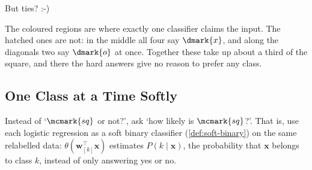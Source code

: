 \begin{question}
    But ties? :-)
\end{question}

The coloured regions are where exactly one classifier claims the input. The
hatched ones are not: in the middle all four say \(\dmark{x}\), and along the
diagonals two say \(\dmark{o}\) at once. Together these take up about a third
of the square, and there the hard answers give no reason to prefer any class.

\subsection{One Class at a Time Softly}

Instead of `\(\mcmark{sq}\) or not?', ask `how likely is \(\mcmark{sq}\)?'.
That is, use each logistic regression as a soft binary classifier
(\autoref{def:soft-binary}) on the same relabelled data: \(\theta(\bm{w}_{[k]}^\top
\bm{x})\) estimates \(P(k \mid \bm{x})\), the probability that \(\bm{x}\) belongs
to class \(k\), instead of only answering yes or no.

